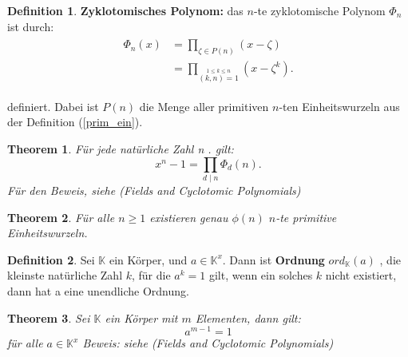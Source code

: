 \documentclass[12pt,oneside]{article}
\newtheorem{theorem}{Theorem}[section]
\theoremstyle{remark}
\theoremstyle{definition}
\newtheorem{definition}{Definition}[section]
\begin{document}
\begin{definition}\label{def_cyc_poly}
\textbf{Zyklotomisches Polynom:} das $n$-te zyklotomische Polynom $\Phi_{n}$ ist durch:\newline
\begin{equation}
    \begin{split}
        \begin{aligned}
            \Phi_{n}(x) &= \prod_{\zeta \in P(n)} (x -\zeta) \\
            &= \prod _{\stackrel {1\leq k\leq n}{(k,n)=1}}\left(x- \zeta^k\right).
        \end{aligned}
    \end{split}
\end{equation}

definiert. Dabei ist $P(n)$ die Menge aller primitiven $n$-ten Einheitswurzeln aus der Definition (\ref{prim_ein}). 
\end{definition}

\smallskip

\begin{theorem}\label{impor_cyc_lemma}
Für jede natürliche Zahl n . gilt:\newline
\begin{equation}
    x^n - 1 = \prod_{d \mid n} \Phi_{d}(n).
\end{equation}
Für den Beweis, siehe (Fields and Cyclotomic Polynomials) 
\end{theorem}

\smallskip

\begin{theorem}\label{num_of_prim_uni}
Für alle $n \geq 1$ existieren genau $\phi(n)$ $n$-te primitive Einheitswurzeln. 
\end{theorem}

\smallskip

\begin{definition}\label{ord_def}
Sei $\mathbb{K}$ ein Körper, und $a \in \mathbb{K}^x$. Dann ist \textbf{Ordnung} $ ord_{ \mathbb{K} }(a)$ , die kleinste natürliche Zahl $k$, für die $a^k = 1 $ gilt, wenn ein solches $k$ nicht existiert, dann hat a eine unendliche Ordnung. 
\end{definition}

\smallskip

\begin{theorem}
Sei $\mathbb{K}$ ein Körper mit $m$ Elementen, dann gilt:
\begin{equation}
    a^{m-1} = 1
\end{equation}
für alle $a \in \mathbb{K}^x$\newline
Beweis: siehe (Fields and Cyclotomic Polynomials) 
\end{theorem}
\end{document}
